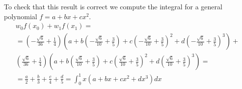 \begin{solution}
  \newpage
  To check that this result is correct we compute the integral for a
  general polynomial $f = a + bx + cx^2$.
  \begin{align*}
    w_0 f(x_0) + w_1 f(x_1)  = \\
    = \left(- \frac{\sqrt{6}}{36} + \frac{1}{4}\right) \left(a + b
    \left(- \frac{\sqrt{6}}{10} + \frac{3}{5}\right) + c \left(-
    \frac{\sqrt{6}}{10} + \frac{3}{5}\right)^{2} + d \left(-
    \frac{\sqrt{6}}{10} + \frac{3}{5}\right)^{3}\right) + \\
    \left(\frac{\sqrt{6}}{36} + \frac{1}{4}\right) \left(a + b
    \left(\frac{\sqrt{6}}{10} + \frac{3}{5}\right) + c
    \left(\frac{\sqrt{6}}{10} + \frac{3}{5}\right)^{2} + d
    \left(\frac{\sqrt{6}}{10} + \frac{3}{5}\right)^{3}\right) = \\
    = \frac{a}{2} + \frac{b}{3} + \frac{c}{4} + \frac{d}{5}= \int_0^1
    x (a + bx + cx^2 + dx^3) dx \\
  \end{align*}
\end{solution}


